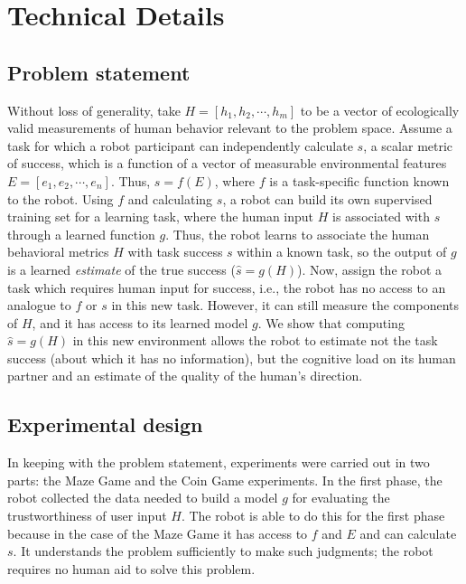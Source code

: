 \documentclass{sig-alternate}
\begin{document}
\section{Technical Details}
\subsection{Problem statement}
Without loss of generality, take $H=[h_1,h_2,\cdots,h_m]$ to be a
vector of ecologically valid measurements of human behavior relevant to
the problem space.  Assume a task for which a robot participant can
independently calculate $s$, a scalar metric of success, which is a
function of a vector of measurable environmental features
$E=[e_1,e_2,\cdots,e_n]$.  Thus, $s = f(E)$, where $f$ is a
task-specific function known to the robot.  Using $f$ and calculating
$s$, a robot can build its own supervised training set for a learning
task, where the human input $H$ is associated with $s$ through a
learned function $g$.  Thus, the robot learns to associate the human
behavioral metrics $H$ with task success $s$ within a known task, so
the output of $g$ is a learned \emph{estimate} of the true success
($\hat{s}=g(H)$).  Now, assign the robot a task which requires human
input for success, i.e., the robot has no access to an analogue to $f$
or $s$ in this new task.  However, it can still measure the components
of $H$, and it has access to its learned model $g$.  We show that
computing $\hat{s}=g(H)$ in this new environment allows the robot to
estimate not the task success (about which it has no information), but
the cognitive load on its human partner and an estimate of the quality
of the human's direction.
\subsection{Experimental design}
In keeping with the problem statement, experiments were carried out in
two parts: the Maze Game and the Coin Game experiments. In the first
phase, the robot collected the data needed to build a model $g$ for
evaluating the trustworthiness of user input $H$. The robot is able to
do this for the first phase because in the case of the Maze Game it
has access to $f$ and $E$ and can calculate $s$.  It understands the
problem sufficiently to make such judgments; the robot requires no
human aid to solve this problem.

\end{document}
